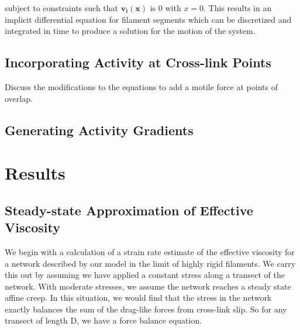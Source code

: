 \documentclass[pre,preprint]{revtex4-1}
\begin{document}
subject to constraints such that $\mathbf{v_i(x)}$ is 0 with $x=0$.  This results in an implicit differential equation for filament segments which can be discretized and integrated in time to produce a solution for the motion of the system.






\subsection{Incorporating Activity at Cross-link Points}

Discuss the modifications to the equations to add a motile force at points of overlap.




\subsection{Generating Activity Gradients}



































\section{Results}

\subsection{Steady-state Approximation of Effective Viscosity}
\label{sec:eff_vic}
We begin with a calculation of a strain rate estimate of the effective viscosity for a network described by our model in the limit of highly rigid filaments.  We carry this out by assuming we have applied a constant stress along a transect of the network.  With moderate stresses, we assume the network reaches a steady state affine creep. In this situation, we would find that the stress in the network exactly balances the sum of the drag-like forces from cross-link slip.  So for any transect of length D, we have a force balance equation.
\end{document}
